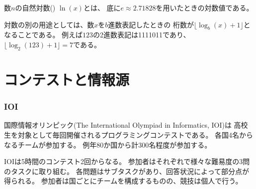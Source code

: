 数$n$の自然対数() $\ln(x)$とは、
底に$e \approx 2.71828$を用いたときの対数値である。

対数の別の用途としては、数$x$を$b$進数表記したときの
桁数が$\lfloor \log_b(x)+1 \rfloor$となることである。
例えば$123$の2進数表記は1111011であり、$\lfloor \log_2(123)+1 \rfloor = 7$である。

\begin{comment}
\section{Contests and resources}
\end{comment}

\section{コンテストと情報源}

\subsubsection{IOI}

\begin{comment}
The International Olympiad in Informatics (IOI)
is an annual programming contest for
secondary school students.
Each country is allowed to send a team of
four students to the contest.
There are usually about 300 participants
from 80 countries.

The IOI consists of two five-hour long contests.
In both contests, the participants are asked to
solve three algorithm tasks of various difficulty.
The tasks are divided into subtasks,
each of which has an assigned score.
Even if the contestants are divided into teams,
they compete as individuals.
\end{comment}

国際情報オリンピック(The International Olympiad in Informatics, IOI)は
高校生を対象として毎回開催されるプログラミングコンテストである。
各国4名からなるチームが参加する。
例年80か国から計300名程度が参加する。

IOIは5時間のコンテスト2回からなる。
参加者はそれぞれで様々な難易度の3問のタスクに取り組む。
各問題はサブタスクがあり、回答状況によって部分点が得られる。
参加者は国ごとにチームを構成するものの、競技は個人で行う。

\begin{comment}
The IOI syllabus \cite{iois} regulates the topics
that may appear in IOI tasks.
Almost all the topics in the IOI syllabus
are covered by this book.

Participants for the IOI are selected through
national contests.
Before the IOI, many regional contests are organized,
such as the Baltic Olympiad in Informatics (BOI),
the Central European Olympiad in Informatics (CEOI)
and the Asia-Pacific Informatics Olympiad (APIO).

Some countries organize online practice contests
for future IOI participants,
such as the Croatian Open Competition in Informatics \cite{coci}
and the USA Computing Olympiad \cite{usaco}.
In addition, a large collection of problems from Polish contests
is available online \cite{main}.
\end{comment}

